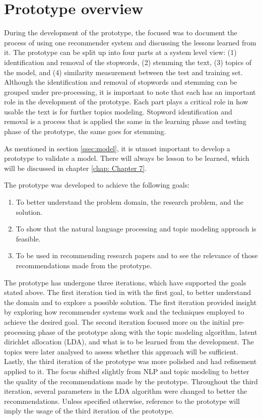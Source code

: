\section{Prototype overview}
During the development of the prototype, the focused was to document the process of using one recommender system and discussing the lessons learned from it.
The prototype can be split up into four parts at a system level view: (1) identification and removal of the stopwords, (2) stemming the text, (3) topics of the model, and (4) similarity measurement between the test and training set. Although the identification and removal of stopwords and stemming can be grouped under pre-processing, it is important to note that each has an important role in the development of the prototype. Each part plays a critical role in how usable the text is for further topics modeling. Stopword identification and removal is a process that is applied the same in the learning phase and testing phase of the prototype, the same goes for stemming.

As mentioned in section \ref{ssec:model}, it is utmost important to develop a prototype to validate a model. There will always be lesson to be learned, which will be discussed in chapter \ref{chap: Chapter 7}.

The prototype was developed to achieve the following goals:

\begin{enumerate}
    \item To better understand the problem domain, the research problem, and the solution.
    \item To show that the natural language processing and topic modeling approach is feasible.
    \item To be used in recommending research papers and to see the relevance of those recommendations made from the prototype.
\end{enumerate}

The prototype has undergone three iterations, which have supported the goals stated above. The first iteration tied in with the first goal, to better understand the domain and to explore a possible solution. The first iteration provided insight by exploring how recommender systems work and the techniques employed to achieve the desired goal. The second iteration focused more on the initial pre-processing phase of the prototype along with the topic modeling algorithm, latent dirichlet allocation (LDA), and what is to be learned from the development. The topics were later analysed to assess whether this approach will be sufficient. Lastly, the third iteration of the prototype was more polished and had refinement applied to it. The focus shifted slightly from NLP and topic modeling to better the quality of the recommendations made by the prototype. Throughout the third iteration, several parameters in the LDA algorithm were changed to better the recommendations. Unless specified otherwise, reference to the prototype will imply the usage of the third iteration of the prototype.

